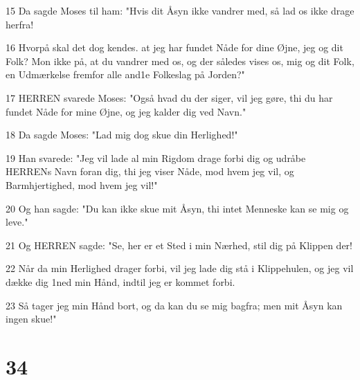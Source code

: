 \par 15 Da sagde Moses til ham: "Hvis dit Åsyn ikke vandrer med, så lad os ikke drage herfra!
\par 16 Hvorpå skal det dog kendes. at jeg har fundet Nåde for dine Øjne, jeg og dit Folk? Mon ikke på, at du vandrer med os, og der således vises os, mig og dit Folk, en Udmærkelse fremfor alle and1e Folkeslag på Jorden?"
\par 17 HERREN svarede Moses: "Også hvad du der siger, vil jeg gøre, thi du har fundet Nåde for mine Øjne, og jeg kalder dig ved Navn."
\par 18 Da sagde Moses: "Lad mig dog skue din Herlighed!"
\par 19 Han svarede: "Jeg vil lade al min Rigdom drage forbi dig og udråbe HERRENs Navn foran dig, thi jeg viser Nåde, mod hvem jeg vil, og Barmhjertighed, mod hvem jeg vil!"
\par 20 Og han sagde: "Du kan ikke skue mit Åsyn, thi intet Menneske kan se mig og leve."
\par 21 Og HERREN sagde: "Se, her er et Sted i min Nærhed, stil dig på Klippen der!
\par 22 Når da min Herlighed drager forbi, vil jeg lade dig stå i Klippehulen, og jeg vil dække dig 1ned min Hånd, indtil jeg er kommet forbi.
\par 23 Så tager jeg min Hånd bort, og da kan du se mig bagfra; men mit Åsyn kan ingen skue!"

\chapter{34}

